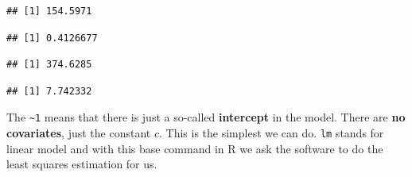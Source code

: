 \documentclass[
]{book}
\newenvironment{Shaded}{\begin{snugshade}}{\end{snugshade}}
\newcommand{\CommentTok}[1]{\textcolor[rgb]{0.56,0.35,0.01}{\textit{#1}}}
\newcommand{\DecValTok}[1]{\textcolor[rgb]{0.00,0.00,0.81}{#1}}
\newcommand{\FunctionTok}[1]{\textcolor[rgb]{0.13,0.29,0.53}{\textbf{#1}}}
\newcommand{\NormalTok}[1]{#1}
\newcommand{\SpecialCharTok}[1]{\textcolor[rgb]{0.81,0.36,0.00}{\textbf{#1}}}
\begin{document}
\begin{verbatim}
## [1] 154.5971
\end{verbatim}

\begin{Shaded}
\end{Shaded}

\begin{verbatim}
## [1] 0.4126677
\end{verbatim}

\begin{Shaded}
\end{Shaded}

\begin{verbatim}
## [1] 374.6285
\end{verbatim}

\begin{Shaded}
\end{Shaded}

\begin{verbatim}
## [1] 7.742332
\end{verbatim}

The \texttt{\textasciitilde{}1} means that there is just a so-called \textbf{intercept} in the model.
There are \textbf{no covariates}, just the constant \(c\).
This is the simplest we can do. \texttt{lm} stands for linear model and with this base
command in R we ask the software to do the least squares estimation for us.
\end{document}
